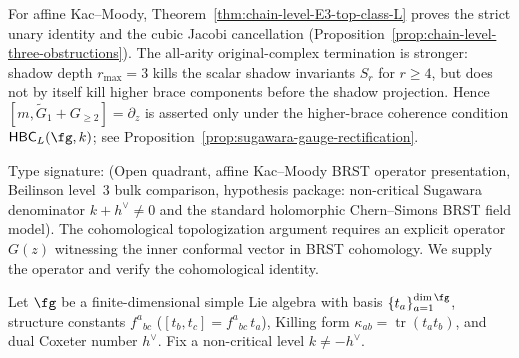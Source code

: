 \begin{remark}
\begin{enumerate}[label=\textup{(\roman*)}]
 For affine Kac--Moody, Theorem~\ref{thm:chain-level-E3-top-class-L}
 proves the strict unary identity and the cubic Jacobi
 cancellation
 \textup{(}Proposition~\textup{\ref{prop:chain-level-three-obstructions}}\textup{)}.
 The all-arity original-complex termination is stronger:
 shadow depth $r_{\max}=3$ kills the scalar shadow invariants
 $S_r$ for $r\geq4$, but does not by itself kill higher brace
 components before the shadow projection. Hence
 $[m,\widetilde G_1+G_{\geq2}]=\partial_z$ is asserted only
 under the higher-brace coherence condition
 $\mathsf{HBC}_L(\fg,k)$; see
 Proposition~\ref{prop:sugawara-gauge-rectification}.
\end{enumerate}
\end{remark}

\begin{construction}
\label{constr:sugawara-antighost}%
%
%
%
\ClaimStatusProvedHere
Type signature: \textup{(}Open quadrant, affine Kac--Moody BRST
operator presentation, Beilinson level~$3$ bulk comparison,
hypothesis package: non-critical Sugawara denominator
$k+h^\vee\neq0$ and the standard holomorphic Chern--Simons BRST
field model\textup{)}.
The cohomological topologization argument requires an explicit
operator $G(z)$ witnessing the inner conformal vector in BRST
cohomology. We supply the operator and verify the cohomological
identity.

Let $\fg$ be a finite-dimensional simple Lie algebra with basis
$\{t_a\}_{a=1}^{\dim\fg}$, structure constants
$f^a{}_{bc}$ ($[t_b, t_c] = f^a{}_{bc}\,t_a$), Killing form
$\kappa_{ab} = \operatorname{tr}(t_a t_b)$, and dual Coxeter number
$h^\vee$. Fix a non-critical level $k \ne -h^\vee$.


\end{construction}

